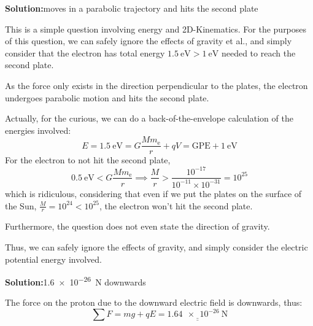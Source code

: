 \documentclass[11pt]{article}
\newcommand*\circled[1]{\tikz[baseline=(char.base)]{
		\node[shape=circle,draw,inner sep=2pt] (char) {#1};}}
\def\doubleunderline#1{\underline{\underline{#1}}}
\newcommand{\solution}[2]{\textbf{Solution:\hspace{1em}\circled{#1}}\hspace{1em}#2\hspace{1em}}
\begin{document}
\begin{enumerate}[label={[Q\arabic*]},itemsep={1em}]
		\item \solution{B}{moves in a parabolic trajectory and hits the second plate}
		
			This is a simple question involving energy and 2D-Kinematics. For the purposes of this question, we can safely ignore the effects of gravity et al., and simply consider that the electron has total energy $\SI{1.5}{\electronvolt} > \SI{1}{\electronvolt}$ needed to reach the second plate.
			
			As the force only exists in the direction perpendicular to the plates, the electron undergoes parabolic motion and hits the second plate.
			
			\begin{center}
			\end{center}
			{
				\setlength{\parskip}{0.5\parskip}
				\footnotesize 
				Actually, for the curious, we can do a back-of-the-envelope calculation of the energies involved:
				\begin{equation*}
					E = \SI{1.5}{\electronvolt} = G\frac{Mm_{\text{e}}}{r} + qV = \text{GPE} + \SI{1}{\electronvolt}
				\end{equation*}
				For the electron to not hit the second plate,
				\begin{equation*}
					\SI{0.5}{\electronvolt} < G\frac{Mm_{\text{e}}}{r} \implies \frac{M}{r} > \frac{10^{-17}}{10^{-11} \times 10^{-31}}  = 10^{25}
				\end{equation*}			
				which is ridiculous, considering that even if we put the plates on the surface of the Sun, $\frac{M}{r} = 10^{24} < 10^{25}$, the electron won't hit the second plate.  
				
				Furthermore, the question does not even state the direction of gravity.
				
				Thus, we can safely ignore the effects of gravity, and simply consider the electric potential energy involved. 
			}
		
		\item \solution{E}{\SI{1.6e-26}{\newton} downwards}
		
			The force on the proton due to the downward electric field is downwards, thus:
			\begin{equation*}
				\sum F = mg + qE = \doubleunderline{\SI{1.64e-26}{\newton}}
			\end{equation*}
		

\end{enumerate}
\end{document}
